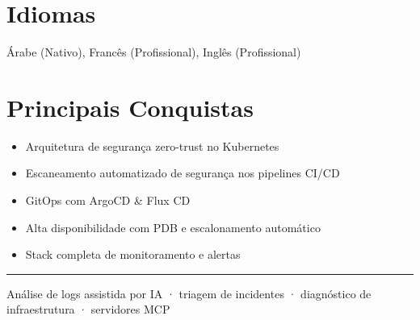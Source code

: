 \documentclass[10pt,a4paper]{article}
\begin{document}
\section*{Idiomas}
Árabe (Nativo), Francês (Profissional), Inglês (Profissional)\par
\section*{Principais Conquistas}
\begin{itemize}
  \item Arquitetura de segurança zero-trust no Kubernetes
  \item Escaneamento automatizado de segurança nos pipelines CI/CD
  \item GitOps com ArgoCD \& Flux CD
  \item Alta disponibilidade com PDB e escalonamento automático
  \item Stack completa de monitoramento e alertas
\end{itemize}
\vspace{6pt}\hrule\vspace{3pt}
{\footnotesize\color{graytext} Análise de logs assistida por IA · triagem de incidentes · diagnóstico de infraestrutura · servidores MCP\par}
\end{document}
